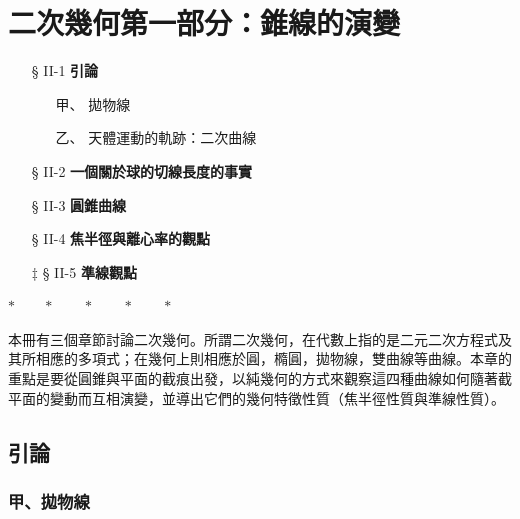 
\section{二次幾何\texorpdfstring{\quad }{ }第一部分：錐線的演變}
\label{sec:b4-ch2}

\begin{center}
\begin{minipage}{0.75\textwidth}
\begin{itemize}[leftmargin=2em, itemsep=0.3em]
  \item[§ II-1] \textbf{引論}
  \begin{itemize}[leftmargin=2em, itemsep=0.2em]
    \item[甲、] 拋物線
    \item[乙、] 天體運動的軌跡：二次曲線
  \end{itemize}
  \item[§ II-2] \textbf{一個關於球的切線長度的事實}
  \item[§ II-3] \textbf{圓錐曲線}
  \item[§ II-4] \textbf{焦半徑與離心率的觀點}
  \item[$\ddagger$ § II-5] \textbf{準線觀點}
\end{itemize}
\end{minipage}
\end{center}

\begin{center}
$* \qquad * \qquad * \qquad * \qquad *$
\end{center}

本冊有三個章節討論二次幾何。所謂二次幾何，在代數上指的是二元二次方程式及其所相應的多項式；在幾何上則相應於圓，橢圓，拋物線，雙曲線等曲線。本章的重點是要從圓錐與平面的截痕出發，以純幾何的方式來觀察這四種曲線如何隨著截平面的變動而互相演變，並導出它們的幾何特徵性質（焦半徑性質與準線性質）。

\subsection{引論}
\label{sec:b4-2-1}

\subsubsection*{甲、拋物線}

